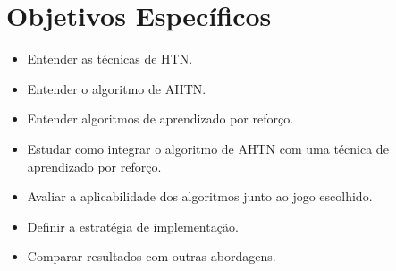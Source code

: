 \section{Objetivos Específicos}
\label{obj:esp}
\begin{itemize}
\item Entender as técnicas de HTN.
\item Entender o algoritmo de AHTN.
\item Entender algoritmos de aprendizado por reforço.
\item Estudar como integrar o algoritmo de AHTN com uma técnica de aprendizado por reforço. %
\item Avaliar a aplicabilidade dos algoritmos junto ao jogo escolhido.
\item Definir a estratégia de implementação.
\item Comparar resultados com outras abordagens.
\end{itemize}






